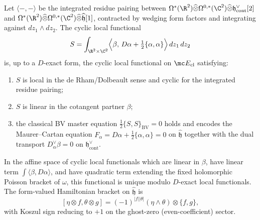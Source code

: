 \documentclass[11pt]{memoir}
\begin{document}
\begin{thm}\label{thm:bf-action-uniqueness-qme}
  Let $\langle-,-\rangle$ be the integrated residue pairing between
  $\Omega^*(\R^2)\widehat\otimes\Omega^{0,*}(\C^2)\widehat\otimes
  \mathfrak h^\vee_{\mathrm{cont}}[2]$ and
  $\Omega^*(\R^2)\widehat\otimes\Omega^{0,*}(\C^2)\widehat\otimes
  \widehat{\mathfrak h}[1]$, contracted by wedging form factors and
  integrating against $dz_1\wedge dz_2$.  The cyclic local functional
  \begin{equation}\label{eq:bf-action}
  S=\int_{\R^2\times\C^2}\Bigl\langle\beta,\,
    D\alpha+\tfrac12\{\alpha,\alpha\}\Bigr\rangle\,dz_1\,dz_2
  \end{equation}
  is, up to a $D$-exact form, the cyclic local functional on
  $\mc E_{\mathrm{cl}}$ satisfying:
  \begin{enumerate}[label=(\roman*)]
    \item $S$ is local in the de Rham/Dolbeault sense and cyclic for the
      integrated residue pairing;
    \item $S$ is linear in the cotangent partner $\beta$;
    \item the classical BV master equation
      $\tfrac12\{S,S\}_{\mathrm{BV}}=0$ holds and encodes the
      Maurer--Cartan equation
      $F_\alpha=D\alpha+\tfrac12\{\alpha,\alpha\}=0$ on
      $\widehat{\mathfrak h}$ together with the dual transport
      $D_\alpha^\vee\beta=0$ on $\mathfrak h^\vee_{\mathrm{cont}}$.
  \end{enumerate}
  In the affine space of cyclic local functionals which are linear in
  \(\beta\), have linear term \(\int\langle\beta,D\alpha\rangle\), and
  have quadratic term extending the fixed holomorphic Poisson bracket
  of \(\omega\), this functional is unique modulo \(D\)-exact local
  functionals.  The form-valued Hamiltonian bracket on
  $\widehat{\mathfrak h}$ is
  $$[\eta\otimes f,\theta\otimes g]
    =(-1)^{|f||\theta|}(\eta\wedge\theta)\otimes\{f,g\},$$
  with Koszul sign reducing to $+1$ on the ghost-zero
  (even-coefficient) sector.
\end{thm}
\end{document}
